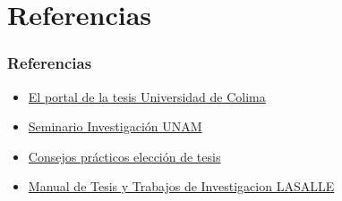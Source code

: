 \documentclass[
	11pt, %
]{beamer}
\begin{document}
\section{Referencias}
\begin{frame}
  \frametitle{Referencias}
  \begin{itemize}
  \item \href{https://recursos.ucol.mx/tesis/tema_investigacion.php}{El portal de la tesis Universidad de Colima}
  \item \href{http://profesores.fi-b.unam.mx/jlfl/Seminario_IEE/Seminario_IEE_Tema_1.pdf}{Seminario Investigación UNAM}
  \item \href{https://guiauniversitaria.mx/6-consejos-practicos-para-elegir-tu-tema-de-tesis/}{Consejos prácticos elección de tesis}
  \item \href{https://www.lasallevictoria.edu.mx/descargas/alumnos/Manual_de_Tesis_y_Trabajos_de_Inv.pdf}{Manual de Tesis y Trabajos de Investigacion LASALLE}
  \end{itemize}
\end{frame}
\end{document}
